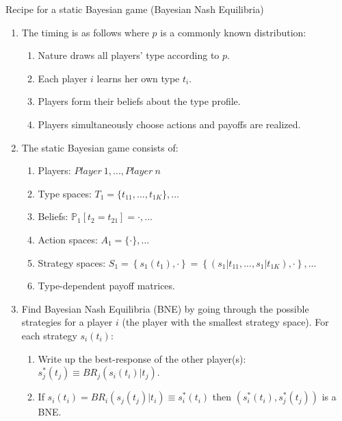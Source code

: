 \begin{frame}{Recipe for a static Bayesian game (Bayesian Nash Equilibria)}
    \begin{enumerate}
      \item The timing is as follows where $p$ is a commonly known distribution:
      \begin{enumerate}\normalsize
        \item Nature draws all players' type according to $p$.
        \item Each player $i$ learns her own type $t_{i}$.
        \item Players form their beliefs about the type profile.
        \item Players simultaneously choose actions and payoffs are realized.
      \end{enumerate}
      \item The static Bayesian game consists of:
      \begin{enumerate}\normalsize
        \item Players: $Player\ 1,...,Player\ n$
        \item Type spaces: $T_1=\{t_{11},...,t_{1K}\},...$
        \item Beliefs: $\mathbb{P}_1[t_2=t_{21}]=\cdot,...$
        \item Action spaces: $A_1=\{\cdot\},...$
        \item Strategy spaces: $S_1=\left\{s_1(t_1),\cdot\right\}=\left\{(s_1|t_{11},...,s_1|t_{1K}),\cdot\right\},...$
        \item Type-dependent payoff matrices.
      \end{enumerate}
      \item Find Bayesian Nash Equilibria (BNE) by going through the possible strategies for a player $i$ (the player with the smallest strategy space). For each strategy $s_i(t_i)$:
      \begin{enumerate}\normalsize
        \item Write up the best-response of the other player(s): $s_j^*(t_j)\equiv BR_j\left(s_i(t_i)|t_j\right)$.
        \item If $s_i(t_i)=BR_i\left(s_j(t_j)|t_i\right)\equiv s_i^*(t_i)$ then $\left(s_i^*(t_i),s_j^*(t_j)\right)$ is a BNE.
      \end{enumerate}
    \end{enumerate}
    \vfill\null
\end{frame}

